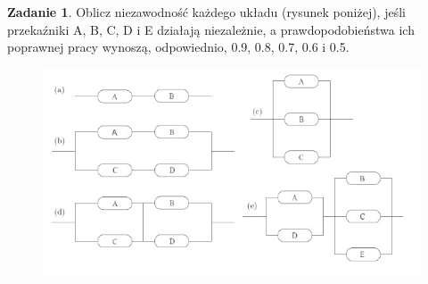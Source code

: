 \documentclass[11pt]{article}
\theoremstyle{definition}
\newtheorem{zadanie}{Zadanie}
\numberwithin{zadanie}{section}
\begin{document}
\begin{zadanie}
    Oblicz niezawodność każdego układu (rysunek poniżej), jeśli przekaźniki A, B, C, D i E działają niezależnie, a prawdopodobieństwa ich poprawnej pracy wynoszą, odpowiednio,
    0.9, 0.8, 0.7, 0.6 i 0.5.

    \begin{figure}[h]
        \includegraphics[width=1\linewidth]{uklady.jpg}
    \end{figure}
\end{zadanie}
\end{document}
